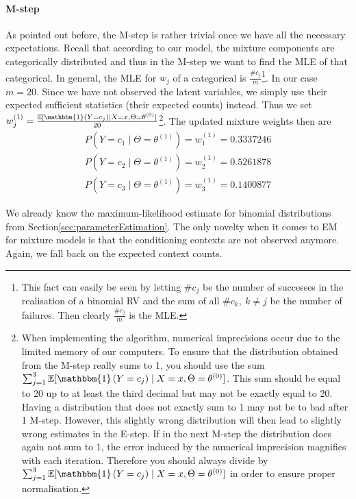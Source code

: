 \documentclass[11pt,leqno,a4paper]{report}\usepackage[]{graphicx}\usepackage[]{color}
\newcommand{\E}{\mathbb{E}}
\newcommand{\id}[1]{\mathbbm{1}\left(#1\right)}
\begin{document}
\paragraph{M-step} As pointed out before, the M-step is rather trivial once we have all the necessary expectations. Recall that according to our model, 
the mixture components are categorically
distributed and thus in the M-step we want to find the MLE of that categorical. In general, the MLE for $ w_{j} $ of a categorical is
$ \frac{\#c_{j}}{m} $\footnote{This fact can easily be seen by letting $ \#c_{j} $ be the number of successes in the realisation of a binomial RV and the sum of all
$ \#c_{k},~k \not = j $ be the number of failures. Then clearly $ \frac{\#c_{j}}{m} $ is the MLE.}. In our case $ m=20 $. Since we have not observed the
latent variables, we simply use their expected sufficient statistics (their expected counts) instead. Thus we set 
$ w_{j}^{(1)} = \frac{\E[\id{Y = c_{j}} \mid X=x,\Theta= \theta^{(0)}]}{20} $\footnote{When implementing the algorithm, numerical imprecisions occur due to the limited
memory of our computers. To ensure that the distribution obtained from the M-step really sums to 1, you should use the sum 
$ \sum_{j=1}^{3} \E[\id{Y = c_{j}} \mid X=x,\Theta= \theta^{(0)}] $. This sum should be equal to 20 up to at least the third decimal but may not be exactly equal to
20. Having a distribution that does not exactly sum to 1 may not be to bad after 1 M-step. However, this slightly wrong distribution will then lead to slightly wrong estimates in the E-step. If in the next M-step the distribution does again not sum to 1, the error induced by the numerical imprecision magnifies with each iteration. Therefore you should always divide by $ \sum_{j=1}^{3} \E[\id{Y = c_{j}} \mid X=x,\Theta= \theta^{(0)}] $ in order to ensure proper normalisation.}. The updated mixture weights then are 
\begin{align}
P(Y=c_{1} \mid \Theta= \theta^{(1)}) = w_{1}^{(1)}= 0.3337246 \\
P(Y=c_{2} \mid \Theta= \theta^{(1)}) = w_{2}^{(1)}= 0.5261878 \nonumber \\
P(Y=c_{3} \mid \Theta= \theta^{(1)}) = w_{3}^{(1)}= 0.1400877 \nonumber
\end{align}

We already know the maximum-likelihood estimate for binomial distributions from 
Section\ref{sec:parameterEstimation}. The only novelty when it comes to EM for mixture models
is that the conditioning contexts are not observed anymore. Again, we fall back on the expected
context counts. 
\end{document}
